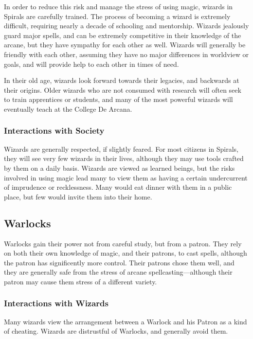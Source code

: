 \begin{multicols}{2}
In order to reduce this risk and manage the stress of using magic, wizards in Spirals are carefully trained.
The process of becoming a wizard is extremely difficult, requiring nearly a decade of schooling and mentorship.
Wizards jealously guard major spells, and can be extremely competitive in their knowledge of the arcane, but they have sympathy for each other as well.
Wizards will generally be friendly with each other, assuming they have no major differences in worldview or goals, and will provide help to each other in times of need.

In their old age, wizards look forward towards their legacies, and backwards at their origins.
Older wizards who are not consumed with research will often seek to train apprentices or students, and many of the most powerful wizards will eventually teach at the College De Arcana.

\subsubsection{Interactions with Society}
Wizards are generally respected, if slightly feared.
For most citizens in Spirals, they will see very few wizards in their lives, although they may use tools crafted by them on a daily basis.
Wizards are viewed as learned beings, but the risks involved in using magic lead many to view them as having a certain undercurrent of imprudence or recklessness.
Many would eat dinner with them in a public place, but few would invite them into their home.

\subsection{Warlocks}

Warlocks gain their power not from careful study, but from a patron.
They rely on both their own knowledge of magic, and their patrons, to cast spells, although the patron has significently more control.
Their patrons chose them well, and they are generally safe from the stress of arcane spellcasting---although their patron may cause them stress of a different variety. 

\subsubsection{Interactions with Wizards}
Many wizards view the arrangement between a Warlock and his Patron as a kind of cheating.
Wizards are distrustful of Warlocks, and generally avoid them.


\end{multicols}
